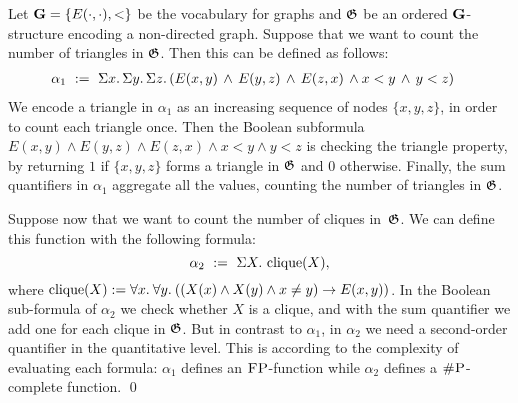\begin{exa}\label{ex:cliques}
Let $\mathbf{G} = \{E(\cdot,\cdot),<\}$ be the vocabulary for graphs and $\mathfrak{G}$ be an ordered $\mathbf{G}$-structure encoding a non-directed graph. 
Suppose that we want to count the number of triangles in $\mathfrak{G}$. Then this can be defined as follows:
\begin{align*}
\alpha_1 \ &:= \ \Sigma{x}.\, \Sigma{y}.\, \Sigma{z}.\, ( E(x,y) \, \wedge \, E(y,z) \, \wedge \, E(z,x) \, \wedge x < y \, \wedge \, y < z )
\end{align*}
We encode a triangle in $\alpha_1$ as an increasing sequence of nodes $\{x, y, z\}$, in order to count each triangle once. Then the Boolean subformula  $E(x,y) \wedge E(y,z) \wedge E(z,x) \wedge
x < y \wedge y < z$ is checking the triangle property, by returning $1$ if $\{x, y, z\}$ forms a triangle in $\mathfrak{G}$ and $0$ otherwise.
Finally, the sum quantifiers in $\alpha_1$ aggregate all the values, counting the number of triangles in $\mathfrak{G}$.

Suppose now that we want to count the number of cliques in~$\mathfrak{G}$. We can define this function with the following formula:
\[
\alpha_2 \ := \ \Sigma{X}.\, \operatorname{clique}(X),
\] 
where $\operatorname{clique}(X) := \forall{x}.\: \forall{y}.\: ((X(x) \wedge X(y) \wedge x \neq y)  \rightarrow E(x,y))$.
In the Boolean sub-formula of $\alpha_2$ we check whether $X$ is a clique, and with the sum quantifier we add one for each clique in $\mathfrak{G}$. 
But in contrast to $\alpha_1$, 
in $\alpha_2$ we need a second-order quantifier in the quantitative level.
This is according to the
complexity of evaluating each formula:
$\alpha_1$ defines an $\text{\sc FP}$-function while $\alpha_2$ defines a $\text{\sc \#P}$-complete function. \qed
\end{exa}
